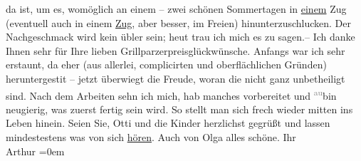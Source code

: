 \begin{ledgroupsized}[t]{13cm}
               da ist, um es, womöglich an einem – zwei schönen Sommertagen in \uline{einem} Zug (eventuell auch in einem \uline{Zug},
               aber besser, im Freien) hinunterzuschlucken. Der Nachgeschmack wird kein übler sein;
               heut trau ich mich es zu sagen.– \pend
           \pstart
           Ich danke Ihnen sehr für Ihre lieben Grillparzerpreisglückwünsche. Anfangs war ich sehr erstaunt, da{\geminationn} eher (aus allerlei, complicirten und oberflächlichen
               Gründen) heruntergesti{\geminationm}t – jetzt überwiegt die Freude,
               woran die {\pb}\label{K_L03011-22v}\label{K_L03011-22h} nicht ganz unbetheiligt sind. Nach dem
               Arbeiten sehn ich mich, hab manches vorbereitet und \substVorne{}\textsuperscript{\textcolor{gray}{au}}\substDazwischen{}bin\substHinten{} neugierig, was zuerst fertig sein wird. So stellt man sich frech wieder
               mitten ins Leben hinein. \pend
           \pstart
           Seien Sie, Otti und die Kinder herzlichst gegrüßt und
               lassen mindestestens was von sich \uline{hören}. Auch von Olga alles schöne.\pend
           \pstart
           Ihr {\\[\baselineskip]}\spacefill\mbox{Arthur}\pend
           \leftskip=0em{}
         
         \endnumbering{}\end{ledgroupsized}\begin{anhang}\end{anhang}\newcommand{\dateiname}{L03011}\newcommand{\titel}{Arthur Schnitzler an Felix Salten, 25. 1. 1908}\newcommand{\editorInnen}{Martin Anton Müller und Laura Untner}
      